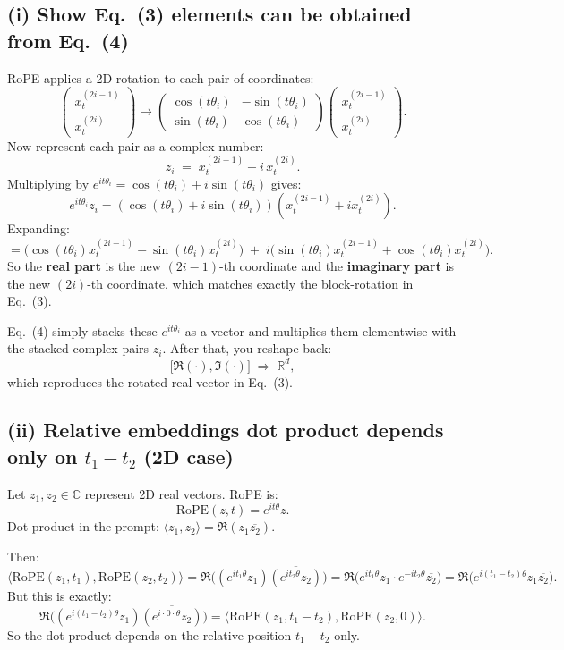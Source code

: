 \documentclass[11pt]{article}
\begin{document}
\subsection*{(i) Show Eq.\ (3) elements can be obtained from Eq.\ (4)}

RoPE applies a 2D rotation to each pair of coordinates:
\[
\begin{pmatrix}
x_t^{(2i-1)}\\
x_t^{(2i)}
\end{pmatrix}
\mapsto
\begin{pmatrix}
\cos(t\theta_i) & -\sin(t\theta_i)\\
\sin(t\theta_i) & \cos(t\theta_i)
\end{pmatrix}
\begin{pmatrix}
x_t^{(2i-1)}\\
x_t^{(2i)}
\end{pmatrix}.
\]
Now represent each pair as a complex number:
\[
z_i \;=\; x_t^{(2i-1)} + i\,x_t^{(2i)}.
\]
Multiplying by $e^{it\theta_i}=\cos(t\theta_i)+i\sin(t\theta_i)$ gives:
\[
e^{it\theta_i} z_i
=
(\cos(t\theta_i)+i\sin(t\theta_i))(x_t^{(2i-1)}+ix_t^{(2i)}).
\]
Expanding:
\[
= \big(\cos(t\theta_i)x_t^{(2i-1)}-\sin(t\theta_i)x_t^{(2i)}\big)
\;+\;
i\big(\sin(t\theta_i)x_t^{(2i-1)}+\cos(t\theta_i)x_t^{(2i)}\big).
\]
So the \textbf{real part} is the new $(2i\!-\!1)$-th coordinate and the \textbf{imaginary part} is the new $(2i)$-th coordinate, which matches exactly the block-rotation in Eq.\ (3).

Eq.\ (4) simply stacks these $e^{it\theta_i}$ as a vector and multiplies them elementwise with the stacked complex pairs $z_i$. After that, you reshape back:
\[
\big[\Re(\cdot),\Im(\cdot)\big] \;\Rightarrow\; \mathbb{R}^d,
\]
which reproduces the rotated real vector in Eq.\ (3).

\subsection*{(ii) Relative embeddings dot product depends only on $t_1-t_2$ (2D case)}

Let $z_1,z_2\in\mathbb{C}$ represent 2D real vectors. RoPE is:
\[
\mathrm{RoPE}(z,t)=e^{it\theta}z.
\]
Dot product in the prompt: $\langle z_1,z_2\rangle=\Re(z_1\overline{z_2})$.

Then:
\[
\langle \mathrm{RoPE}(z_1,t_1),\mathrm{RoPE}(z_2,t_2)\rangle
=
\Re\Big((e^{it_1\theta}z_1)\overline{(e^{it_2\theta}z_2)}\Big)
=
\Re\Big(e^{it_1\theta}z_1\cdot e^{-it_2\theta}\overline{z_2}\Big)
=
\Re\Big(e^{i(t_1-t_2)\theta}z_1\overline{z_2}\Big).
\]
But this is exactly:
\[
\Re\Big((e^{i(t_1-t_2)\theta}z_1)\overline{(e^{i\cdot 0\cdot \theta}z_2)}\Big)
=
\langle \mathrm{RoPE}(z_1,t_1-t_2),\mathrm{RoPE}(z_2,0)\rangle.
\]
So the dot product depends on the relative position $t_1-t_2$ only.
\end{document}
